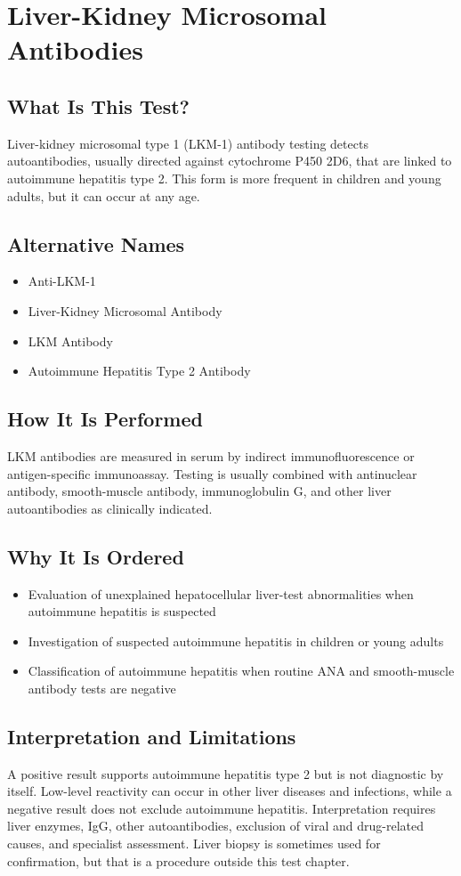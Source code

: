 \chapter{Liver-Kidney Microsomal Antibodies}

\section*{What Is This Test?}
Liver-kidney microsomal type 1 (LKM-1) antibody testing detects autoantibodies, usually directed against cytochrome P450 2D6, that are linked to autoimmune hepatitis type 2. This form is more frequent in children and young adults, but it can occur at any age.

\section*{Alternative Names}
\begin{itemize}
  \item Anti-LKM-1
  \item Liver-Kidney Microsomal Antibody
  \item LKM Antibody
  \item Autoimmune Hepatitis Type 2 Antibody
\end{itemize}
\section*{How It Is Performed}
LKM antibodies are measured in serum by indirect immunofluorescence or antigen-specific immunoassay. Testing is usually combined with antinuclear antibody, smooth-muscle antibody, immunoglobulin G, and other liver autoantibodies as clinically indicated.

\section*{Why It Is Ordered}
\begin{itemize}
  \item Evaluation of unexplained hepatocellular liver-test abnormalities when autoimmune hepatitis is suspected
  \item Investigation of suspected autoimmune hepatitis in children or young adults
  \item Classification of autoimmune hepatitis when routine ANA and smooth-muscle antibody tests are negative
\end{itemize}

\section*{Interpretation and Limitations}
A positive result supports autoimmune hepatitis type 2 but is not diagnostic by itself. Low-level reactivity can occur in other liver diseases and infections, while a negative result does not exclude autoimmune hepatitis. Interpretation requires liver enzymes, IgG, other autoantibodies, exclusion of viral and drug-related causes, and specialist assessment. Liver biopsy is sometimes used for confirmation, but that is a procedure outside this test chapter.
